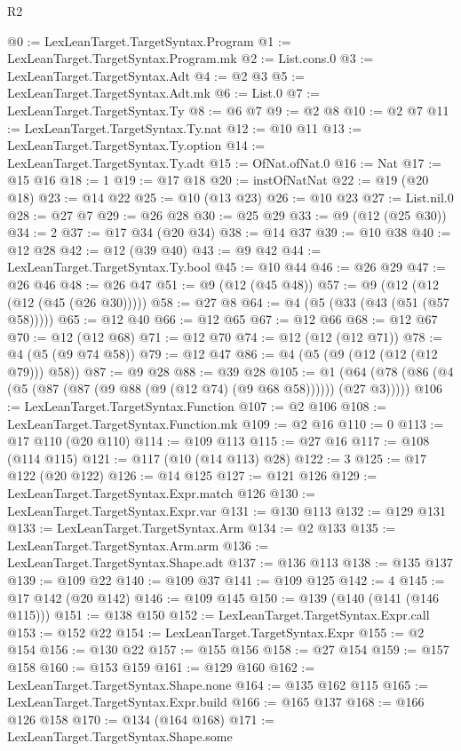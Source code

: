 \begin{lexlean}{R2}
\begin{coremodule}
@0 := LexLeanTarget.TargetSyntax.Program
@1 := LexLeanTarget.TargetSyntax.Program.mk
@2 := List.cons.{0}
@3 := LexLeanTarget.TargetSyntax.Adt
@4 := @2 @3
@5 := LexLeanTarget.TargetSyntax.Adt.mk
@6 := List.{0}
@7 := LexLeanTarget.TargetSyntax.Ty
@8 := @6 @7
@9 := @2 @8
@10 := @2 @7
@11 := LexLeanTarget.TargetSyntax.Ty.nat
@12 := @10 @11
@13 := LexLeanTarget.TargetSyntax.Ty.option
@14 := LexLeanTarget.TargetSyntax.Ty.adt
@15 := OfNat.ofNat.{0}
@16 := Nat
@17 := @15 @16
@18 := 1
@19 := @17 @18
@20 := instOfNatNat
@22 := @19 (@20 @18)
@23 := @14 @22
@25 := @10 (@13 @23)
@26 := @10 @23
@27 := List.nil.{0}
@28 := @27 @7
@29 := @26 @28
@30 := @25 @29
@33 := @9 (@12 (@25 @30))
@34 := 2
@37 := @17 @34 (@20 @34)
@38 := @14 @37
@39 := @10 @38
@40 := @12 @28
@42 := @12 (@39 @40)
@43 := @9 @42
@44 := LexLeanTarget.TargetSyntax.Ty.bool
@45 := @10 @44
@46 := @26 @29
@47 := @26 @46
@48 := @26 @47
@51 := @9 (@12 (@45 @48))
@57 := @9 (@12 (@12 (@12 (@45 (@26 @30)))))
@58 := @27 @8
@64 := @4 (@5 (@33 (@43 (@51 (@57 @58)))))
@65 := @12 @40
@66 := @12 @65
@67 := @12 @66
@68 := @12 @67
@70 := @12 (@12 @68)
@71 := @12 @70
@74 := @12 (@12 (@12 @71))
@78 := @4 (@5 (@9 @74 @58))
@79 := @12 @47
@86 := @4 (@5 (@9 (@12 (@12 (@12 @79))) @58))
@87 := @9 @28
@88 := @39 @28
@105 := @1 (@64 (@78 (@86 (@4 (@5 (@87 (@87 (@9 @88 (@9 (@12 @74) (@9 @68 @58)))))) (@27 @3)))))
@106 := LexLeanTarget.TargetSyntax.Function
@107 := @2 @106
@108 := LexLeanTarget.TargetSyntax.Function.mk
@109 := @2 @16
@110 := 0
@113 := @17 @110 (@20 @110)
@114 := @109 @113
@115 := @27 @16
@117 := @108 (@114 @115)
@121 := @117 (@10 (@14 @113) @28)
@122 := 3
@125 := @17 @122 (@20 @122)
@126 := @14 @125
@127 := @121 @126
@129 := LexLeanTarget.TargetSyntax.Expr.match @126
@130 := LexLeanTarget.TargetSyntax.Expr.var
@131 := @130 @113
@132 := @129 @131
@133 := LexLeanTarget.TargetSyntax.Arm
@134 := @2 @133
@135 := LexLeanTarget.TargetSyntax.Arm.arm
@136 := LexLeanTarget.TargetSyntax.Shape.adt
@137 := @136 @113
@138 := @135 @137
@139 := @109 @22
@140 := @109 @37
@141 := @109 @125
@142 := 4
@145 := @17 @142 (@20 @142)
@146 := @109 @145
@150 := @139 (@140 (@141 (@146 @115)))
@151 := @138 @150
@152 := LexLeanTarget.TargetSyntax.Expr.call
@153 := @152 @22
@154 := LexLeanTarget.TargetSyntax.Expr
@155 := @2 @154
@156 := @130 @22
@157 := @155 @156
@158 := @27 @154
@159 := @157 @158
@160 := @153 @159
@161 := @129 @160
@162 := LexLeanTarget.TargetSyntax.Shape.none
@164 := @135 @162 @115
@165 := LexLeanTarget.TargetSyntax.Expr.build
@166 := @165 @137
@168 := @166 @126 @158
@170 := @134 (@164 @168)
@171 := LexLeanTarget.TargetSyntax.Shape.some

\end{coremodule}
\end{lexlean}
